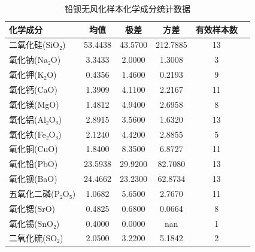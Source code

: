 \documentclass[withoutpreface,bwprint]{cumcmthesis}
\begin{document}
\begin{table}[htbp]
    \centering
    \caption{铅钡无风化样本化学成分统计数据}
    \begin{tabular}{lccccc}
        \hline
        化学成分 & 均值 & 极差 & 方差 & 有效样本数 \\
        \hline
        二氧化硅(SiO₂) & 53.4438 & 43.5700 & 212.7885 & 13 \\
        氧化钠(Na₂O) & 3.3433 & 2.0000 & 1.3008 & 3 \\
        氧化钾(K₂O) & 0.4356 & 1.4600 & 0.2193 & 9 \\
        氧化钙(CaO) & 1.3909 & 4.1100 & 2.2167 & 11 \\
        氧化镁(MgO) & 1.4812 & 4.9400 & 2.6958 & 8 \\
        氧化铝(Al₂O₃) & 2.8915 & 3.5600 & 1.6320 & 13 \\
        氧化铁(Fe₂O₃) & 2.1240 & 4.4200 & 2.8855 & 5 \\
        氧化铜(CuO) & 1.8400 & 8.3500 & 6.8727 & 11 \\
        氧化铅(PbO) & 23.5938 & 29.9200 & 82.7080 & 13 \\
        氧化钡(BaO) & 24.4662 & 23.2300 & 62.8734 & 13 \\
        五氧化二磷(P₂O₅) & 1.0682 & 5.6500 & 2.7670 & 11 \\
        氧化锶(SrO) & 0.4825 & 0.6800 & 0.0664 & 8 \\
        氧化锡(SnO₂) & 0.4000 & 0.0000 & nan & 1 \\
        二氧化硫(SO₂) & 2.0500 & 3.2200 & 5.1842 & 2 \\
        \hline
    \end{tabular}
\end{table}
\end{document}

